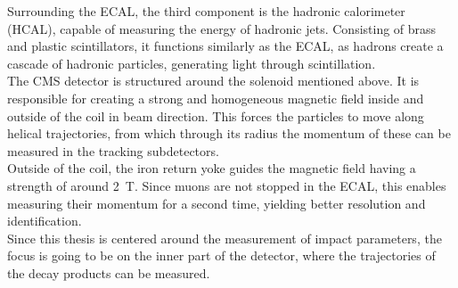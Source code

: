 Surrounding the ECAL, the third component is the hadronic calorimeter (HCAL), capable of measuring the energy of hadronic jets. Consisting of brass and plastic scintillators, it functions similarly as the ECAL, as hadrons create a cascade of hadronic particles, generating light through scintillation.\\
The CMS detector is structured around the solenoid mentioned above. It is responsible for creating a strong and homogeneous magnetic field inside and outside of the coil in beam direction. This forces the particles to move along helical trajectories, from which through its radius the momentum of these can be measured in the tracking subdetectors.\\
Outside of the coil, the iron return yoke guides the magnetic field having a strength of around \SI{2}{\tesla}. Since muons are not stopped in the ECAL, this enables measuring their momentum for a second time, yielding better resolution and identification.\\
Since this thesis is centered around the measurement of impact parameters, the focus is going to be on the inner part of the detector, where the trajectories of the decay products can be measured.